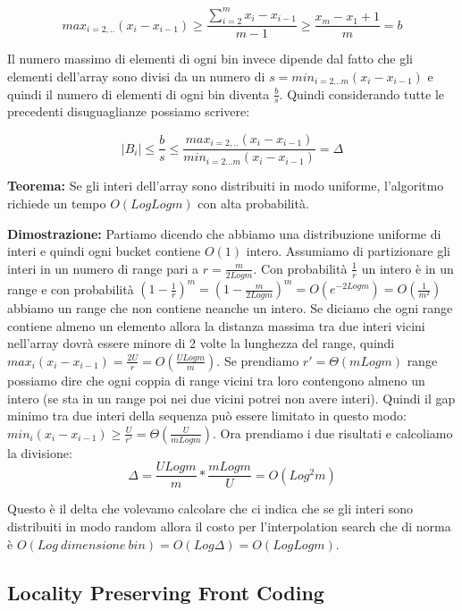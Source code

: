 \documentclass[12pt]{article}
\begin{document}
\begin{equation}
    max_{i=2,..}(x_i-x_{i-1}) \geq \frac{\sum_{i=2}^m x_i - x_{i-1}}{m-1} \geq \frac{x_m - x_1 + 1}{m} = b
\end{equation}

Il numero massimo di elementi di ogni bin invece dipende dal fatto che gli elementi dell'array sono divisi da un numero di $s= min_{i=2...m}(x_i-x_{i-1})$ e quindi il numero di elementi di ogni bin diventa $\frac{b}{s}$.
Quindi considerando tutte le precedenti disuguaglianze possiamo scrivere:

\begin{equation}
    |B_i| \leq \frac{b}{s} \leq \frac{max_{i=2,..}(x_i-x_{i-1}) }{min_{i=2...m}(x_i-x_{i-1})} = \Delta 
\end{equation}

\textbf{Teorema:} 
Se gli interi dell'array sono distribuiti in modo uniforme, l'algoritmo richiede un tempo $O(Log Log m)$ con alta probabilità.

\textbf{Dimostrazione:} Partiamo dicendo che abbiamo una distribuzione uniforme di interi e quindi ogni bucket contiene $O(1)$ intero. 
Assumiamo di partizionare gli interi in un numero di range pari a $r=\frac{m}{2Logm}$. Con probabilità $\frac{1}{r}$ un intero è in un range e con probabilità $(1-\frac{1}{r})^m = (1-\frac{m}{2Logm})^m = O(e^{-2Logm}) = O(\frac{1}{m^2})$ abbiamo un range che non contiene neanche un intero.
Se diciamo che ogni range contiene almeno un elemento allora la distanza massima tra due interi vicini nell'array dovrà essere minore di 2 volte la lunghezza del range, quindi $max_i(x_i-x_{i-1})=\frac{2U}{r}=O(\frac{ULogm}{m})$.
Se prendiamo $r' = \Theta(mLogm)$ range possiamo dire che ogni coppia di range vicini tra loro contengono almeno un intero (se sta in un range poi nei due vicini potrei non avere interi).
Quindi il gap minimo tra due interi della sequenza può essere limitato in questo modo: $min_i(x_i-x_{i-1})\geq \frac{U}{r'} = \Theta(\frac{U}{mLogm})$.
Ora prendiamo i due risultati e calcoliamo la divisione:
\begin{equation}
    \Delta = \frac{ULogm}{m}*\frac{mLogm}{U} = O(Log^2 m)
\end{equation}

Questo è il delta che volevamo calcolare che ci indica che se gli interi sono distribuiti in modo random allora il costo per l'interpolation search che di norma è $O(Log \ dimensione\ bin) = O(Log \Delta) = O(Log Log m)$.


\subsection{Locality Preserving Front Coding}
\end{document}
